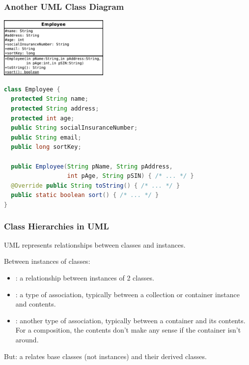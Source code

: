 \begin{frame}[fragile]
\frametitle{Another UML Class Diagram}

\begin{changemargin}{1cm}

\begin{center}
\includegraphics[height=8em]{images/Employee.pdf}
\end{center}

\begin{lstlisting}[language={Java},basicstyle=\tiny]
class Employee {
  protected String name;
  protected String address;
  protected int age;
  public String socialInsuranceNumber;
  public String email;
  public long sortKey;

  public Employee(String pName, String pAddress, 
                  int pAge, String pSIN) { /* ... */ }
  @Override public String toString() { /* ... */ }
  public static boolean sort() { /* ... */ }
}
\end{lstlisting}
\end{changemargin}
\end{frame}

\begin{frame}
\frametitle{Class Hierarchies in UML}

\begin{changemargin}{1cm}
UML represents relationships
between classes and instances.

Between instances of classes:
\begin{itemize}
\item {}: a relationship between instances
of 2 classes.
\item {}: a type of association, typically between a
collection or container instance and contents.
\item {}: another type of association, typically
between a container and its contents. \\
For a composition, the contents
don't make any sense if the container isn't around.
\end{itemize}

But: a  relates base classes (not
instances) and their derived classes.
\end{changemargin}
\end{frame}

